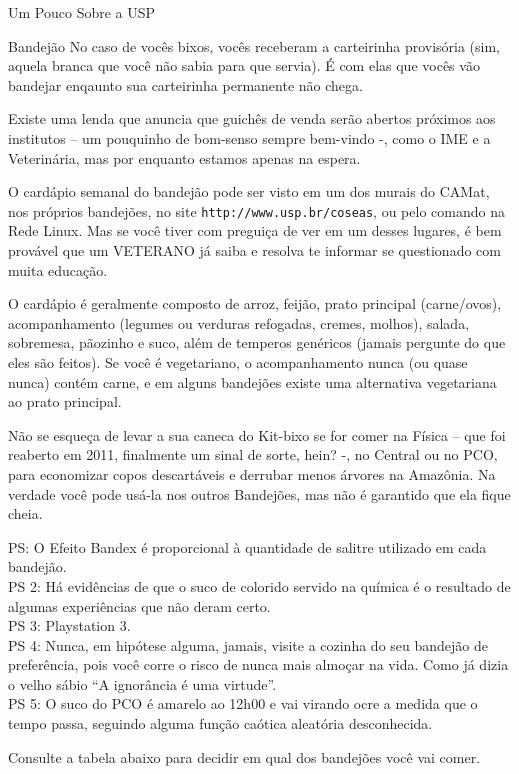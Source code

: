 \begin{secao}{Um Pouco Sobre a USP}
\begin{subsecao}{Bandejão}
No caso de vocês bixos, vocês receberam a carteirinha provisória (sim, aquela 
branca que você não sabia para que servia). É com elas que vocês vão bandejar
enqaunto sua carteirinha permanente não chega.

Existe uma lenda que anuncia que guichês de venda serão abertos próximos aos
institutos – um pouquinho de bom-senso sempre bem-vindo -, como o IME e
a Veterinária, mas por enquanto estamos apenas na espera.

O cardápio semanal do bandejão pode ser visto em um dos murais do CAMat, nos
próprios bandejões, no site {\tt http://www.usp.br/coseas}, ou pelo
comando  na Rede Linux. Mas se você tiver
com preguiça de ver em um desses lugares, é bem provável que um VETERANO já saiba
e resolva te informar se questionado com muita educação.

O cardápio é geralmente composto de arroz, feijão, prato principal (carne/ovos),
acompanhamento (legumes ou verduras refogadas, cremes, molhos), salada, sobremesa,
pãozinho e suco, além de temperos genéricos (jamais pergunte do que eles são feitos).
Se você é vegetariano, o acompanhamento nunca (ou quase nunca) contém carne, e
em alguns bandejões existe uma alternativa vegetariana ao prato principal. %

Não se esqueça de levar a sua caneca do Kit-bixo se for comer na Física – que
foi reaberto em 2011, finalmente um sinal de sorte, hein? -, no Central ou no PCO,
para economizar copos descartáveis e derrubar menos árvores na Amazônia. Na verdade
você pode usá-la nos outros Bandejões, mas não é garantido que ela fique cheia. %

PS: O Efeito Bandex é proporcional à quantidade de salitre utilizado em cada bandejão.\\
PS 2: Há evidências de que o suco de colorido servido na química é o resultado de algumas
experiências que não deram certo.\\
PS 3: Playstation 3.\\
PS 4: Nunca, em hipótese alguma, jamais, visite a cozinha do seu bandejão de preferência,
pois você corre o risco de nunca mais almoçar na vida. Como já dizia o velho sábio ``A
ignorância é uma virtude''.\\
PS 5: O suco do PCO é amarelo ao 12h00 e vai virando ocre a medida que o tempo passa,
seguindo alguma função caótica aleatória desconhecida.

Consulte a tabela abaixo para decidir em qual dos bandejões você vai comer.
\pagebreak

\end{subsecao}

\end{secao}
